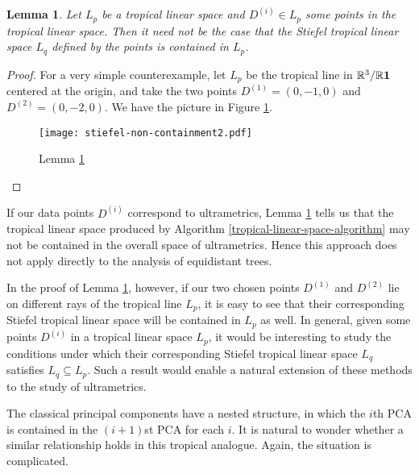 \documentclass[12pt]{extarticle}
\numberwithin{theorem}{section}
\newtheorem{lemma}[theorem]{Lemma}
\newcommand{\RR}{\mathbb{R}}
\begin{document}
\begin{lemma}
\label{Stiefel-containment}
Let $L_p$ be a tropical linear space and $D^{(i)}\in L_p$ some points in the tropical linear space. Then it need not be the case that the Stiefel tropical linear space $L_q$ defined by the points is contained in $L_p$. 
\end{lemma}
\begin{proof}
For a very simple counterexample, let $L_p$ be the tropical line in $\RR^3/\RR {\bf 1}$ centered at the origin, and take the two points $D^{(1)} = (0, -1, 0)$ and $D^{(2)} = (0, -2, 0)$. We have the picture in Figure \ref{Stiefel_exam}.
\begin{figure}[!ht]
\centering
\texttt{[image: stiefel-non-containment2.pdf]}
\caption{Lemma \ref{Stiefel-containment}}
\label{Stiefel_exam}
\end{figure}
\end{proof}

If our data points $D^{(i)}$ correspond to ultrametrics, Lemma \ref{Stiefel-containment} tells us that the tropical linear space produced by Algorithm \ref{tropical-linear-space-algorithm} may not be contained in the overall space of ultrametrics. Hence this approach does not apply directly to the analysis of equidistant trees.

In the proof of Lemma \ref{Stiefel-containment}, however, if our two chosen points $D^{(1)}$ and $D^{(2)}$ lie on different rays of the tropical line $L_p$, it is easy to see that their corresponding Stiefel tropical linear space will be contained in $L_p$ as well. In general, given some points $D^{(i)}$ in a tropical linear space $L_p$, it would be interesting to study the conditions under which their corresponding Stiefel tropical linear space $L_q$ satisfies $L_q\subseteq L_p$. Such a result would enable a natural extension of these methods to the study of ultrametrics.

The classical principal components have a nested structure, in which the $i$th PCA is contained in the $(i+1)$st PCA for each $i$. It is natural to wonder whether a similar relationship holds in this tropical analogue. Again, the situation is complicated.
\end{document}
